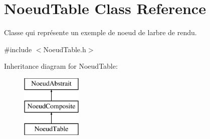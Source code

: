 \hypertarget{class_noeud_table}{}\section{Noeud\+Table Class Reference}
\label{class_noeud_table}


Classe qui représente un exemple de noeud de l\textquotesingle{}arbre de rendu.  




{\ttfamily \#include $<$Noeud\+Table.\+h$>$}

Inheritance diagram for Noeud\+Table\+:\begin{figure}[H]
\begin{center}
\leavevmode
\includegraphics[height=3.000000cm]{class_noeud_table}
\end{center}
\end{figure}
